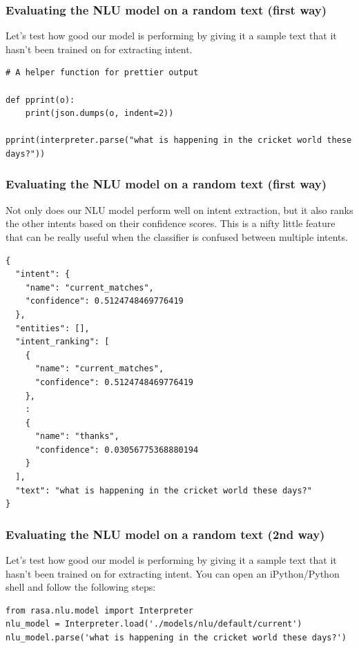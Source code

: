  \begin{frame}[fragile]\frametitle{Evaluating the NLU model on a random text (first way)}
 

Let's test how good our model is performing by giving it a sample text that it hasn't been trained on for extracting intent. 
\begin{lstlisting}
# A helper function for prettier output

def pprint(o):   
    print(json.dumps(o, indent=2))
    
pprint(interpreter.parse("what is happening in the cricket world these days?"))
\end{lstlisting}
 
\end{frame}

 \begin{frame}[fragile]\frametitle{Evaluating the NLU model on a random text (first way)}
Not only does our NLU model perform well on intent extraction, but it also ranks the other intents based on their confidence scores. This is a nifty little feature that can be really useful when the classifier is confused between multiple intents.

\begin{lstlisting}
{
  "intent": {
    "name": "current_matches",
    "confidence": 0.5124748469776419
  },
  "entities": [],
  "intent_ranking": [
    {
      "name": "current_matches",
      "confidence": 0.5124748469776419
    },
	:
    {
      "name": "thanks",
      "confidence": 0.03056775368880194
    }
  ],
  "text": "what is happening in the cricket world these days?"
}
\end{lstlisting}
\end{frame}

 \begin{frame}[fragile]\frametitle{Evaluating the NLU model on a random text (2nd way)}
 

Let's test how good our model is performing by giving it a sample text that it hasn't been trained on for extracting intent. You can open an iPython/Python shell and follow the following steps: 
\begin{lstlisting}
from rasa.nlu.model import Interpreter
nlu_model = Interpreter.load('./models/nlu/default/current')
nlu_model.parse('what is happening in the cricket world these days?')
\end{lstlisting}
 
\end{frame}

